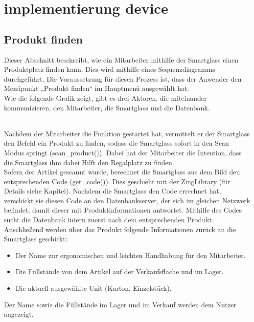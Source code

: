 \chapter{implementierung device}
\label{cha:impl_device}
\section{Produkt finden}
\label{sec:produkt_finden}
Dieser Abschnitt beschreibt, wie ein Mitarbeiter mithilfe der Smartglass einen Produktplatz finden kann. Dies wird mithilfe eines Sequenzdiagramms durchgeführt. Die Voraussetzung für diesen Prozess ist, dass der Anwender den Menüpunkt „Produkt finden“ im Hauptmenü ausgewählt hat. 
\\
Wie die folgende Grafik zeigt, gibt es drei Aktoren, die miteinander kommunizieren, den Mitarbeiter, die Smartglass und die Datenbank. 
\\
\begin{figure}

\end{figure}
\\
Nachdem der Mitarbeiter die Funktion gestartet hat, vermittelt er der Smartglass den Befehl ein Produkt zu finden, sodass die Smartglass sofort in den Scan Modus springt (scan_product()). Dabei hat der Mitarbeiter die Intention, dass die Smartglass ihm dabei Hilft den Regalplatz zu finden.
\\
Sofern der Artikel gescannt wurde, berechnet die Smartglass aus dem Bild den entsprechenden Code (get_code()). Dies geschieht mit der ZingLibrary (für Details siehe Kapitel). Nachdem die Smartglass den Code errechnet hat, verschickt sie diesen Code an den Datenbankserver, der sich im gleichen Netzwerk befindet, damit dieser mit Produktinformationen antwortet. Mithilfe des Codes sucht die Datenbank intern zuerst nach dem entsprechenden Produkt. Anschließend werden über das Produkt folgende Informationen zurück an die Smartglass geschickt:
\\
\begin{itemize}
	\item Der Name zur ergonomischen und leichten Handhabung für den Mitarbeiter.
	\item Die Füllstände von dem Artikel auf der Verkaufsfläche und im  Lager.
	\item Die aktuell ausgewählte Unit (Karton, Einzelstück).
\end{itemize}
Der Name sowie die Füllstände im Lager und im Verkauf werden dem Nutzer angezeigt. 
\\
